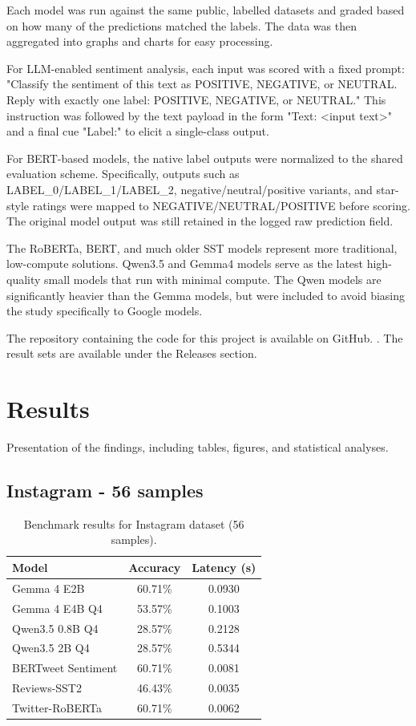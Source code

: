 \documentclass[11pt,table,xcdraw]{article}
\begin{document}
Each model was run against the same public, labelled datasets and graded based on how many of the predictions matched the labels. The data was then aggregated into graphs and charts for easy processing.

For LLM-enabled sentiment analysis, each input was scored with a fixed prompt: "Classify the sentiment of this text as POSITIVE, NEGATIVE, or NEUTRAL. Reply with exactly one label: POSITIVE, NEGATIVE, or NEUTRAL." This instruction was followed by the text payload in the form "Text: <input text>" and a final cue "Label:" to elicit a single-class output.

For BERT-based models, the native label outputs were normalized to the shared evaluation scheme. Specifically, outputs such as LABEL\_0/LABEL\_1/LABEL\_2, negative/neutral/positive variants, and star-style ratings were mapped to NEGATIVE/NEUTRAL/POSITIVE before scoring. The original model output was still retained in the logged raw prediction field.

The RoBERTa, BERT, and much older SST models represent more traditional, low-compute solutions. Qwen3.5 and Gemma4 models serve as the latest high-quality small models that run with minimal compute. The Qwen models are significantly heavier than the Gemma models, but were included to avoid biasing the study specifically to Google models.

The repository containing the code for this project is available on GitHub. \cite{sentimentanalysisrepo}. The result sets are available under the Releases section.

\section{Results}
Presentation of the findings, including tables, figures, and statistical analyses.

\subsection{Instagram - 56 samples}

\begin{table}[H]
\centering
\begin{tabular}{@{}lcc@{}}
\toprule
\textbf{Model} & \textbf{Accuracy} & \textbf{Latency (s)} \\
\midrule
Gemma 4 E2B & 60.71\% & 0.0930 \\
Gemma 4 E4B Q4 & 53.57\% & 0.1003 \\
Qwen3.5 0.8B Q4 & 28.57\% & 0.2128 \\
Qwen3.5 2B Q4 & 28.57\% & 0.5344 \\
BERTweet Sentiment & 60.71\% & 0.0081 \\
Reviews-SST2 & 46.43\% & 0.0035 \\
Twitter-RoBERTa & 60.71\% & 0.0062 \\
\bottomrule
\end{tabular}
\caption{Benchmark results for Instagram dataset (56 samples).}
\label{tab:benchmark-results-instagram}
\end{table}
\end{document}
